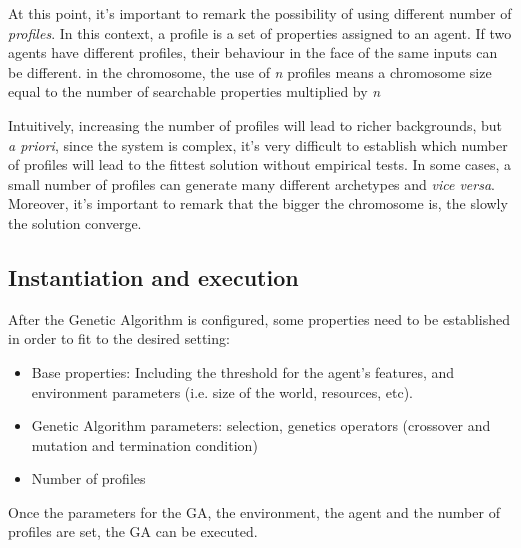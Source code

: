 \documentclass{sig-alternate}
\begin{document}

At this point, it's important to remark the possibility of using different number of {\em profiles}. In this context, a profile is a set of properties assigned to an agent. If two agents have different profiles, their behaviour in the face of the same inputs can be different. in the chromosome, the use of \textit{n} profiles means a chromosome size equal to the number of searchable properties multiplied by \textit{n} 

Intuitively, increasing the number of profiles will lead to richer backgrounds, but \textit{a priori}, since the system is complex, it's very difficult to establish which number of profiles will lead to the fittest solution without empirical tests. In some cases, a small number of profiles can generate many different archetypes and \textit{vice versa}. Moreover, it's important to remark that the bigger the chromosome is, the slowly the solution converge.


\subsection{Instantiation and execution}

After the Genetic Algorithm is configured, some properties need to be established in order to fit to the desired setting:
\begin{itemize}
\item Base properties: Including the threshold for the agent's features, and environment parameters (i.e. size of the world, resources, etc).
\item Genetic Algorithm parameters: selection, genetics operators (crossover and mutation and termination condition)
\item Number of profiles
\end{itemize}

Once the parameters for the GA, the environment, the agent and the number of profiles are set, the GA can be executed.
\end{document}
